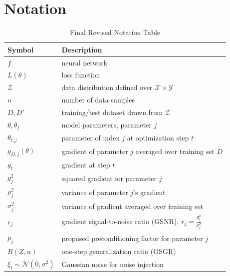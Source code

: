 \documentclass{article}
\theoremstyle{plain}
\theoremstyle{definition}
\theoremstyle{remark}
\begin{document}
\section{Notation}
\label{ap: notation}
\begin{table}[ht]
\caption{Final Revised Notation Table}
\label{tab:final_notation}
\vskip 0.15in
\begin{center}
\begin{small}
\renewcommand{\arraystretch}{1.3} %
\begin{tabular}{ll}
\toprule
\textbf{Symbol} & \textbf{Description} \\
\midrule
$f$ & neural network \\
$L(\theta)$ & loss function \\
$\mathcal{Z}$ & data distribution defined over $\mathcal{X} \times \mathcal{Y}$ \\
$n$ & number of data samples \\
$D, D'$ & training/test dataset drawn from $\mathcal{Z}$ \\
$\theta, \theta_j$ & model parameters, parameter $j$ \\
$\theta_{t,j}$ & parameter of index $j$ at optimization step $t$ \\
$g_{D,j}(\theta)$ & gradient of parameter $j$ averaged over training set $D$ \\
$g_t$ & gradient at step $t$ \\
$g_j^2$ & squared gradient for parameter $j$ \\
$\rho_j^2$ & variance of parameter $j$'s gradient \\
$\sigma_j^2$ & variance of gradient averaged over training set \\
$r_j$ & gradient signal-to-noise ratio (GSNR), $r_j = \frac{g_j^2}{\rho_j^2}$ \\
$p_j$ & proposed preconditioning factor for parameter $j$ \\
$R(Z,n)$ & one-step generalization ratio (OSGR) \\
$\xi_t \sim \mathcal{N}(0,\sigma^2)$ & Gaussian noise for noise injection \\

\end{tabular}
\end{small}
\end{center}
\end{table}
\end{document}
